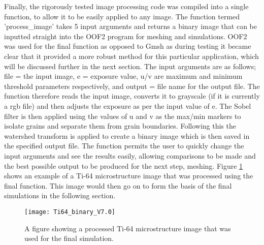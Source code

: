 \documentclass[\report.tex]{subfiles}
\begin{document}
\noindent Finally, the rigorously tested image processing code was compiled into a single function, to allow it to be easily applied to any image. The function termed 'process\_image' takes 5 input arguments and returns a binary image that can be inputted straight into the OOF2 program for meshing and simulations. OOF2 was used for the final function as opposed to Gmsh as during testing it became clear that it provided a more robust method for this particular application, which will be discussed further in the next section. The input arguments are as follows; file = the input image, e = exposure value, u/v are maximum and minimum threshold parameters respectively, and output = file name for the output file. The function therefore reads the input image, converts it to grayscale (if it is currently a rgb file) and then adjusts the exposure as per the input value of e. The Sobel filter is then applied using the values of u and v as the max/min markers to isolate grains and separate them from grain boundaries. Following this the watershed transform is applied to create a binary image which is then saved in the specified output file. The function permits the user to quickly change the input arguments and see the results easily, allowing comparisons to be made and the best possible output to be produced for the next step, meshing. Figure \ref{fig:FinalSim} shows an example of a Ti-64 microstructure image that was processed using the final function. This image would then go on to form the basis of the final simulations in the following section.

\begin{figure}[!htb]
  \centering
  \texttt{[image: Ti64\_binary\_V7.0]}
  \caption{A figure showing a processed Ti-64 microstructure image that was used for the final simulation.}
  \label{fig:FinalSim}
\end{figure}
\end{document}
